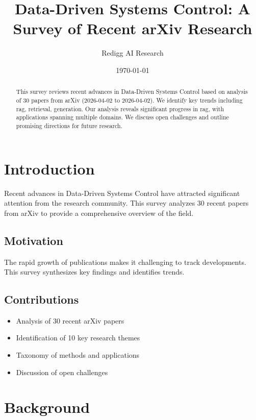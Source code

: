 \documentclass[11pt,a4paper]{article}
\title{Data-Driven Systems Control: A Survey of Recent arXiv Research}
\author{Redigg AI Research}
\date{\today}
\begin{document}
\maketitle

\begin{abstract}
This survey reviews recent advances in Data-Driven Systems Control based on analysis of 30 papers from arXiv (2026-04-02 to 2026-04-02). We identify key trends including rag, retrieval, generation. Our analysis reveals significant progress in rag, with applications spanning multiple domains. We discuss open challenges and outline promising directions for future research.
\end{abstract}


\section{Introduction}

Recent advances in Data-Driven Systems Control have attracted significant attention from the research community. This survey analyzes 30 recent papers from arXiv to provide a comprehensive overview of the field.

\subsection{Motivation}

The rapid growth of publications makes it challenging to track developments. This survey synthesizes key findings and identifies trends.

\subsection{Contributions}

\begin{itemize}
    \item Analysis of 30 recent arXiv papers
    \item Identification of 10 key research themes
    \item Taxonomy of methods and applications
    \item Discussion of open challenges
\end{itemize}



\section{Background}
\end{document}
